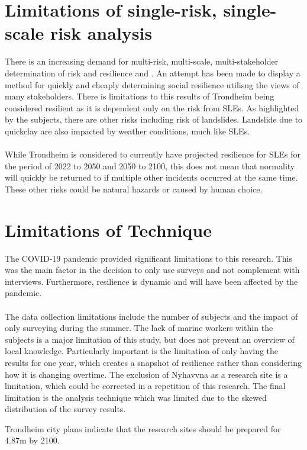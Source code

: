 \section{Limitations of single-risk, single-scale risk analysis}
There is an increasing demand for multi-risk, multi-scale, multi-stakeholder determination of risk and resilience \cite{gerkensmeier_governing_2018} and \cite{cutter_community_2020}. An attempt has been made to display a method for quickly and cheaply determining social resilience utilisng the views of many stakeholders. There is limitations to this results of Trondheim being considered resilient as it is dependent only on the risk from SLEs. As highlighted by the subjects, there are other risks including risk of landslides. Landslide due to quickclay are also impacted by weather conditions, much like SLEs. 
\paragraph{}

While Trondheim is considered to currently have projected resilience for SLEs for the period of 2022 to 2050 and 2050 to 2100, this does not mean that normality will quickly be returned to if multiple other incidents occurred at the same time. These other risks could be natural hazards or caused by human choice. 

\section{Limitations of Technique}
The COVID-19 pandemic provided significant limitations to this research. This was the main factor in the decision to only use surveys and not complement with interviews. Furthermore, resilience is dynamic and will have been affected by the pandemic. 
\paragraph{}
The data collection limitations include the number of subjects and the impact of only surveying during the summer. The lack of marine workers within the subjects is a major limitation of this study, but does not prevent an overview of local knowledge. Particularly important is the limitation of only having the results for one year, which creates a snapshot of resilience rather than considering how it is changing overtime.  The exclusion of Nyhavvna as a research site is a limitation, which could be corrected in a repetition of this research.  The final limitation is the analysis technique which was limited due to the skewed distribution of the survey results.





Trondheim city plans indicate that the research sites should be prepared for 4.87m by 2100.